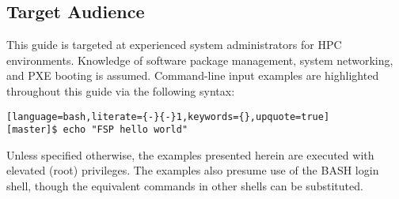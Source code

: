 \subsection{Target Audience}

This guide is targeted at experienced \Linux{} system administrators for HPC
environments. Knowledge of software package management, system networking, and
PXE booting is assumed.  Command-line input examples are highlighted throughout
this guide via the following syntax:

\begin{lstlisting}[language=bash,literate={-}{-}1,keywords={},upquote=true]
[master]$ echo "FSP hello world"
\end{lstlisting}

Unless specified otherwise, the examples presented herein are executed with
elevated (root) privileges. The examples also presume use of the BASH login
shell, though the equivalent commands in other shells can be substituted.

